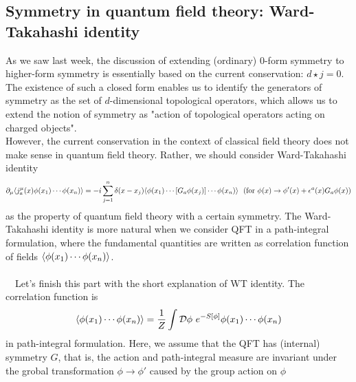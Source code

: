 \documentclass{ltjsarticle}
\theoremstyle{mystyle} %
\numberwithin{equation}{section}
\begin{document}
\subsection{Symmetry in quantum field theory: Ward-Takahashi identity}
As we saw last week, the discussion of extending (ordinary) $0$-form symmetry to higher-form symmetry is 
essentially based on the current conservation: $d\star j=0$. 
The existence of such a closed form enables us to identify the generators of symmetry as the set of $d$-dimensional topological operators, 
which allows us to extend the notion of symmetry as "action of topological operators acting on charged objects". \\
 However, the current conservation in the context of classical field theory does not make sense in quantum field theory. 
 Rather, we should consider Ward-Takahashi identity
 \begin{align}
    \partial_\mu\langle{j^\mu_a(x)\phi(x_1)\cdots \phi(x_n)}\rangle
    =-i\sum_{j=1}^{n}\delta(x-x_j)\langle{\phi(x_1)\cdots [G_a \phi(x_j)]\cdots \phi(x_n)}\rangle~~
    (\mathrm{for}~\phi(x)\to \phi'(x)+ \epsilon^a (x)G_a \phi(x))
    \label{WTeq}
 \end{align}
as the property of quantum field theory with a certain symmetry. 
The Ward-Takahashi identity is more natural when we consider QFT in a path-integral formulation, 
where the fundamental quantities are written as correlation function of fields $\langle{\phi(x_1)\cdots \phi(x_n)}\rangle$. \\\\
　Let's finish this part with the short explanation of WT identity. 
The correlation function is 
\begin{align}
    \langle{\phi(x_1)\cdots \phi(x_n)}\rangle
    =\frac{1}{Z}\int \mathcal{D}{\phi}~ e^{-S[\phi]}\phi(x_1)\cdots \phi(x_n)
\label{corr}
\end{align}
in path-integral formulation. 
Here, we assume that the QFT has (internal) symmetry $G$, that is, 
the action and path-integral measure are invariant under the grobal transformation $\phi\to \phi'$ caused by the group action on $\phi$
\end{document}
